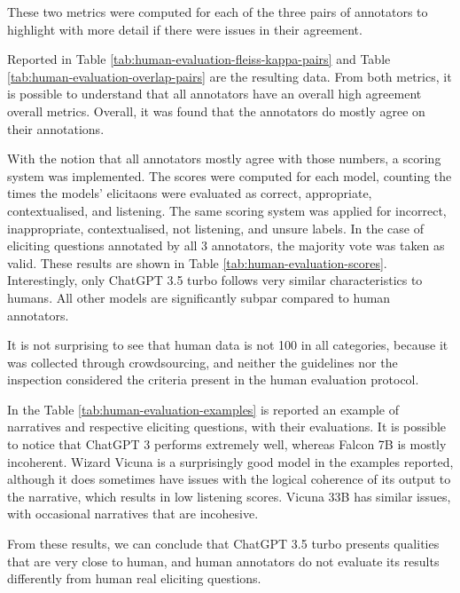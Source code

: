 
These two metrics were computed for each of the three pairs of annotators to highlight with more detail if there were issues in their agreement. 


Reported in Table \ref{tab:human-evaluation-fleiss-kappa-pairs} and Table \ref{tab:human-evaluation-overlap-pairs} are the resulting data. From both metrics, it is possible to understand that all annotators have an overall high agreement overall metrics.
Overall, it was found that the annotators do mostly agree on their annotations.


With the notion that all annotators mostly agree with those numbers, a scoring system was implemented. The scores were computed for each model, counting the times the models' elicitaons were evaluated as correct, appropriate, contextualised, and listening. The same scoring system was applied for incorrect, inappropriate, contextualised, not listening, and unsure labels. In the case of eliciting questions annotated by all 3 annotators, the majority vote was taken as valid. These results are shown in Table \ref{tab:human-evaluation-scores}.
Interestingly, only ChatGPT 3.5 turbo follows very similar characteristics to humans. All other models are significantly subpar compared to human annotators. 


% 
It is not surprising to see that human data is not 100 in all categories, because it was collected through crowdsourcing, and neither the guidelines nor the inspection considered the criteria present in the human evaluation protocol. 

In the Table \ref{tab:human-evaluation-examples} is reported an example of narratives and respective eliciting questions, with their evaluations. It is possible to notice that ChatGPT 3 performs extremely well, whereas Falcon 7B is mostly incoherent. Wizard Vicuna is a surprisingly good model in the examples reported, although it does sometimes have issues with the logical coherence of its output to the narrative, which results in low listening scores. Vicuna 33B has similar issues, with occasional narratives that are incohesive. 

From these results, we can conclude that ChatGPT 3.5 turbo presents qualities that are very close to human, and human annotators do not evaluate its results differently from human real eliciting questions. 

